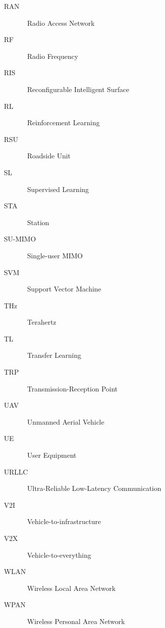 \documentclass[journal,comsoc]{IEEEtran}
\begin{document}
\begin{description}
	\item[RAN] \qquad\, Radio Access Network
	\item[RF] \qquad\, Radio Frequency
	\item[RIS] \qquad\, Reconfigurable Intelligent Surface
	\item[RL] \qquad\, Reinforcement Learning
	\item[RSU] \qquad\, Roadside Unit
	\item[SL] \qquad\, Supervised Learning
	\item[STA] \qquad\, Station
	\item[SU-MIMO] \qquad\, Single-user MIMO
	\item[SVM] \qquad\, Support Vector Machine
	\item[THz] \qquad\, Terahertz
	\item[TL] \qquad\, Transfer Learning
	\item[TRP] \qquad\, Transmission-Reception Point
	\item[UAV] \qquad\, Unmanned Aerial Vehicle
	\item[UE] \qquad\, User Equipment
	\item[URLLC] \qquad\, Ultra-Reliable Low-Latency Communication
	\item[V2I] \qquad\, Vehicle-to-infrastructure
	\item[V2X] \qquad\, Vehicle-to-everything
	\item[WLAN] \qquad\, Wireless Local Area Network
	\item[WPAN] \qquad\, Wireless Personal Area Network
\end{description}

\ifCLASSOPTIONcaptionsoff
  \newpage
\fi





\end{document}
